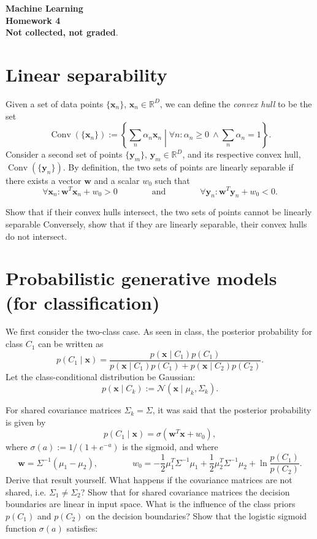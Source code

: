 \documentclass[11pt,noanswers,addpoints]{exam}
\DeclareMathOperator{\Conv}{Conv}
\newcommand{\R}{\mathbb R}
\newcommand{\x}{\mathbf x}
\newcommand{\w}{\mathbf w}
\newcommand{\y}{\mathbf y}
\newcommand{\N}{\mathcal N}
\newcommand{\bigmid}{\mathrel{}\middle|\mathrel{}}
\begin{document}
{\Large{\textbf{Machine Learning}}} \\[2mm]
\textbf{\Huge{Homework 4}}\\[2mm]


\textbf{Not collected, not graded}.



\section{Linear separability}
Given a set of data points $\{\x_n\}$, $\x_n\in\R^D$, we can define the \emph{convex hull} to be the set 
$$\Conv(\{\x_n\}) := \left\{ \sum_n\alpha_n\x_n \bigmid \forall n\colon \alpha_n\geq0\ \wedge \sum_n\alpha_n=1 \right\}.$$
Consider a second set of points $\{\y_m\}$, $\y_m\in\R^D$, and its respective convex hull, $\Conv(\{\y_n\})$. By definition, the two sets of points are linearly separable if there exists a vector $\w$ and a scalar $w_0$ such that $$\forall \x_n\colon \w^T\x_n + w_0 > 0 \qquad\qquad\text{and}\qquad\qquad \forall \y_n\colon \w^T\y_n + w_0 < 0.$$
\begin{questions}
\question Show that if their convex hulls intersect, the two sets of points cannot be linearly separable
\question Conversely, show that if they are linearly separable, their convex hulls do not intersect.
\end{questions}

\section{Probabilistic generative models (for classification)}
We first consider the two-class case. As seen in class, the posterior probability for class $C_1$ can be written as 
$$p(C_1\mid\x)=\frac{p(\x\mid C_1)p(C_1)}{p(\x\mid C_1)p(C_1)+p(\x\mid C_2)p(C_2)}.$$
Let the class-conditional distribution be Gaussian:
$$p(\x\mid C_k) := \N(\x\mid \mu_k, \Sigma_k).$$
\begin{questions}
\question For shared covariance matrices $\Sigma_k=\Sigma$, it was said that the posterior probability is given by
$$p(C_1\mid\x) = \sigma(\w^T\x+w_0),$$
where $\sigma(a):=1/(1+e^{-a})$ is the sigmoid, and where 
$$\w = \Sigma^{-1}(\mu_1-\mu_2),\qquad\qquad w_0=-\frac{1}{2}\mu_1^T\Sigma^{-1}\mu_1 + \frac{1}{2}\mu_2^T\Sigma^{-1}\mu_2 + \ln\frac{p(C_1)}{p(C_2)}.$$
Derive that result yourself.
\question What happens if the covariance matrices are not shared, i.e. $\Sigma_1\neq\Sigma_2$?
\question Show that for shared covariance matrices the decision boundaries are linear in input space.
\question What is the influence of the class priors $p(C_1)$ and $p(C_2)$ on the decision boundaries?
\question Show that the logistic sigmoid function $\sigma(a)$ satisfies:
\end{questions}
\end{document}
